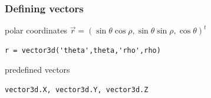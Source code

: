 \documentclass[compress]{beamer}
\begin{document}
\begin{frame}
  \frametitle{Defining vectors}

  \begin{overlayarea}{\textwidth}{8cm}

    polar coordinates $\vec r = (\sin \theta \cos \rho,\sin \theta \sin \rho,\cos \theta)^{t}$

\begin{lstlisting}[style=input]
r = vector3d('theta',theta,'rho',rho)
\end{lstlisting}

  \pause \medskip

  predefined vectors
\begin{lstlisting}[style=input]
vector3d.X, vector3d.Y, vector3d.Z
\end{lstlisting}

  \pause \medskip


\end{overlayarea}
\end{frame}
\end{document}
